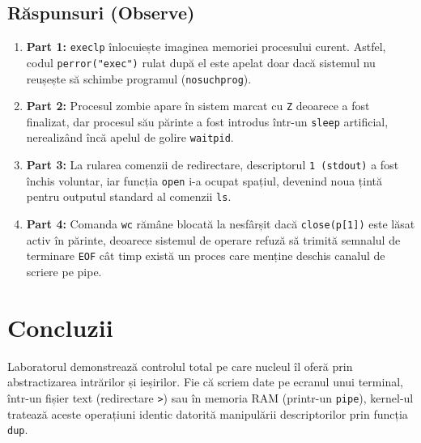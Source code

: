 \documentclass[12pt,a4paper]{article}
\begin{document}
\subsection{Răspunsuri (Observe)}
\begin{enumerate}
    \item \textbf{Part 1:} \texttt{execlp} înlocuiește imaginea memoriei procesului curent. Astfel, codul \texttt{perror("exec")} rulat după el este apelat doar dacă sistemul nu reușește să schimbe programul (\texttt{nosuchprog}).
    \item \textbf{Part 2:} Procesul zombie apare în sistem marcat cu \texttt{Z} deoarece a fost finalizat, dar procesul său părinte a fost introdus într-un \texttt{sleep} artificial, nerealizând încă apelul de golire \texttt{waitpid}.
    \item \textbf{Part 3:} La rularea comenzii de redirectare, descriptorul \texttt{1 (stdout)} a fost închis voluntar, iar funcția \texttt{open} i-a ocupat spațiul, devenind noua țintă pentru outputul standard al comenzii \texttt{ls}.
    \item \textbf{Part 4:} Comanda \texttt{wc} rămâne blocată la nesfârșit dacă \texttt{close(p[1])} este lăsat activ în părinte, deoarece sistemul de operare refuză să trimită semnalul de terminare \texttt{EOF} cât timp există un proces care menține deschis canalul de scriere pe pipe.
\end{enumerate}

\section{Concluzii}
Laboratorul demonstrează controlul total pe care nucleul îl oferă prin abstractizarea intrărilor și ieșirilor. Fie că scriem date pe ecranul unui terminal, într-un fișier text (redirectare \texttt{>}) sau în memoria RAM (printr-un \texttt{pipe}), kernel-ul tratează aceste operațiuni identic datorită manipulării descriptorilor prin funcția \texttt{dup}.
\end{document}
